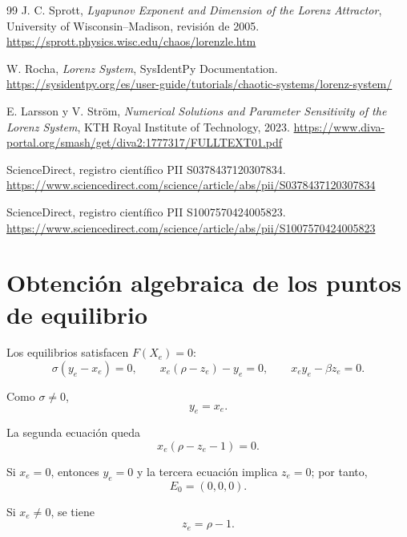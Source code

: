 \documentclass[12pt,a4paper,oneside]{report}
\numberwithin{equation}{chapter}
\begin{document}
\begin{thebibliography}{99}
 J. C. Sprott, \emph{Lyapunov Exponent and Dimension of the Lorenz Attractor}, University of Wisconsin--Madison, revisión de 2005. \url{https://sprott.physics.wisc.edu/chaos/lorenzle.htm}

 W. Rocha, \emph{Lorenz System}, SysIdentPy Documentation. \url{https://sysidentpy.org/es/user-guide/tutorials/chaotic-systems/lorenz-system/}

 E. Larsson y V. Ström, \emph{Numerical Solutions and Parameter Sensitivity of the Lorenz System}, KTH Royal Institute of Technology, 2023. \url{https://www.diva-portal.org/smash/get/diva2:1777317/FULLTEXT01.pdf}

 ScienceDirect, registro científico PII S0378437120307834. \url{https://www.sciencedirect.com/science/article/abs/pii/S0378437120307834}

 ScienceDirect, registro científico PII S1007570424005823. \url{https://www.sciencedirect.com/science/article/abs/pii/S1007570424005823}

\end{thebibliography}

\appendix{}

\chapter{Obtención algebraica de los puntos de equilibrio}
\label{app:equilibrios}

Los equilibrios satisfacen \(F(X_e)=0\):
\begin{equation}
    \sigma(y_e-x_e)=0,\qquad x_e(\rho-z_e)-y_e=0,\qquad x_ey_e-\beta z_e=0.
\end{equation}

Como \(\sigma\neq0\),
\begin{equation}
    y_e=x_e.
\end{equation}

La segunda ecuación queda
\begin{equation}
    x_e(\rho-z_e-1)=0.
\end{equation}

Si \(x_e=0\), entonces \(y_e=0\) y la tercera ecuación implica \(z_e=0\); por tanto,
\begin{equation}
    E_0=(0,0,0).
\end{equation}

Si \(x_e\neq0\), se tiene
\begin{equation}
    z_e=\rho-1.
\end{equation}
\end{document}
